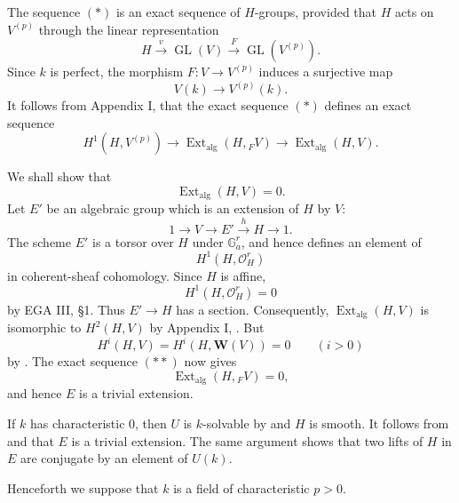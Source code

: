
The sequence \((*)\) is an exact sequence of \(H\)-groups,
provided that \(H\) acts on \(V^{(p)}\) through the linear
representation
\[
  H\xrightarrow{v}\operatorname{GL}(V)
    \xrightarrow{F}\operatorname{GL}(V^{(p)}).
\]
Since \(k\) is perfect, the morphism \(F:V\to V^{(p)}\) induces
a surjective map
\[
  V(k)\longrightarrow V^{(p)}(k).
\]
It follows from Appendix I,  that the exact sequence \((*)\)
defines an exact sequence
\[
  \tag{**}\label{sga3:xvii:proposition:5-4-1:equation:double-star}
  H^1(H,V^{(p)})\longrightarrow
  \operatorname{Ext}_{\mathrm{alg}}(H,{}_F V)
  \longrightarrow
  \operatorname{Ext}_{\mathrm{alg}}(H,V).
\]

We shall show that
\[
  \operatorname{Ext}_{\mathrm{alg}}(H,V)=0.
\]
Let \(E'\) be an algebraic group which is an extension of \(H\)
by \(V\):
\[
  1\longrightarrow V\longrightarrow E'
    \xrightarrow{h}H\longrightarrow1.
\]
The scheme \(E'\) is a torsor over \(H\) under
\(\mathbb G_a^r\), and hence defines an element of
\[
  H^1(H,\mathcal O_H^r)
\]
in coherent-sheaf cohomology.  Since \(H\) is affine,
\[
  H^1(H,\mathcal O_H^r)=0
\]
by EGA III, \S1.  Thus \(E'\to H\) has a section.  Consequently,
\(\operatorname{Ext}_{\mathrm{alg}}(H,V)\) is isomorphic to
\(H^2(H,V)\) by Appendix I, .  But
\[
  H^i(H,V)=H^i(H,\mathbf W(V))=0\qquad(i>0)
\]
by .  The exact sequence \((**)\) now gives
\[
  \operatorname{Ext}_{\mathrm{alg}}(H,{}_F V)=0,
\]
and hence \(E\) is a trivial extension.


If \(k\) has characteristic \(0\), then \(U\) is \(k\)-solvable
by  and \(H\) is smooth.  It follows from  and
 that \(E\) is a trivial extension.  The same argument
shows that two lifts of \(H\) in \(E\) are conjugate by an
element of \(U(k)\).

Henceforth we suppose that \(k\) is a field of characteristic
\(p>0\).

